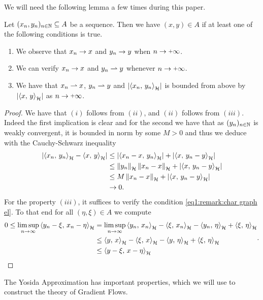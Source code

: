 We will need the following lemma a few times during this paper.

\begin{lemma}\label{lemma:weak seq cond}
	Let $ (x_n,y_n)_{n\in\mathbb{N}}\subseteq A $
	be a sequence. Then we have
	$ (x,y)\in A $ if at least one of the following
	conditions is true.
	\begin{enumerate}[label=(\roman*)]
		\item We observe that $ x_n\rightarrow x $ and $ y_n\rightarrow y $ when $ n\ra\plus\infty $.
		\item We can verify $ x_n\rightarrow x $ and $ y_n\rightharpoonup y $ whenever $ n\ra\plus\infty $.
		\item We have that $ x_n\rightharpoonup x $, $ y_n\rightharpoonup y $ and 
		$ \left\vert \left\langle x_n,\,y_n\right\rangle_{\mathcal{H}}\right\vert $ is bounded from above by 
		$ \left\vert \left\langle x,\,y\right\rangle_{\mathcal{H}}\right\vert $ as $ n\ra\plus\infty $.
	\end{enumerate}
\end{lemma}
\begin{proof}
	We have that $ (i) $ follows from $ (ii) $, and $ (ii) $ follows from
	$ (iii) $. Indeed the first implication is clear and for the second we
	have that as $ (y_n)_{n\in\mathbb{N}} $ is weakly convergent, it is 
	bounded in norm by some $ M>0 $ and thus we deduce with
	the Cauchy-Schwarz inequality
	\begin{align*}
		\left\vert \left\langle x_n,\,y_n\right\rangle_{\mathcal{H}}-\left\langle x,\,y\right\rangle_{\mathcal{H}}\right\vert
		&\leq \left\vert \left\langle x_n-x,\,y_n\right\rangle_{\mathcal{H}}\right\vert
		+\left\vert \left\langle x,\,y_n-y\right\rangle_{\mathcal{H}}\right\vert\\
		&\leq \left\Vert y_n\right\Vert_{\mathcal{H}}\left\Vert x_n-x\right\Vert_{\mathcal{H}}
		+\left\vert \left\langle x,\,y_n-y\right\rangle_{\mathcal{H}}\right\vert\\
		&\leq M\left\Vert x_n-x\right\Vert_{\mathcal{H}}
		+\left\vert \left\langle x,\,y_n-y\right\rangle_{\mathcal{H}}\right\vert\\
		&\rightarrow 0.
	\end{align*}
	For the property $ (iii) $, it suffices to verify the condition 
	\eqref{eq1:remark:char graph el}.
	To that end for all $ (\eta, \xi)\in A $ we compute
	\begin{align*}
		\begin{split}
			0
			\leq \limsup_{n \rightarrow \infty}\left\langle y_n-\xi,\,x_n-\eta\right\rangle_{\mathcal{H}}
			&=\limsup_{n \rightarrow \infty}\left\langle y_n,\,x_n\right\rangle_{\mathcal{H}}
			-\left\langle \xi,\,x_n\right\rangle_{\mathcal{H}}
			-\left\langle y_n,\,\eta\right\rangle_{\mathcal{H}}
			+\left\langle \xi,\,\eta\right\rangle_{\mathcal{H}}\\
			&\leq \left\langle y,\,x\right\rangle_{\mathcal{H}}
			-\left\langle \xi,\,x\right\rangle_{\mathcal{H}}
			-\left\langle y,\,\eta\right\rangle_{\mathcal{H}}
			+\left\langle \xi,\,\eta\right\rangle_{\mathcal{H}}\\
			&\leq\left\langle y-\xi,\,x-\eta\right\rangle_{\mathcal{H}}
		\end{split}.
	\end{align*}
\end{proof}

The Yosida Approximation has important properties, which we will use to 
construct the theory of Gradient Flows.

